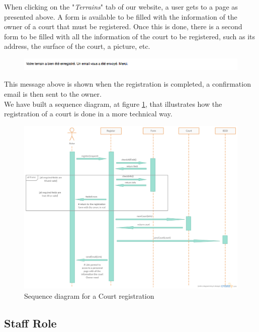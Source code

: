 \documentclass[a4paper, 12pt]{article}
\begin{document}
When clicking on the "\textit{Terrains}" tab of our website, a user gets to a page as presented above. A form is available to be filled with the information of the owner of a court that must be registered. Once this is done, there is a second form to be filled with all the information of the court to be registered, such as its address, the surface of the court, a picture, etc.\\

\begin{figure}[h]
\includegraphics[scale=0.5]{courtmail.png}
\end{figure}

This message above is shown when the registration is completed, a confirmation email is then sent to the owner.\\

We have built a sequence diagram, at figure \ref{courtseq}, that illustrates how the registration of a court is done in a more technical way.\\

\begin{figure}[h]
   \caption{\label{courtseq} Sequence diagram for a Court registration}
  \includegraphics[scale=0.4]{courtseq.png}
\end{figure}

\FloatBarrier
\newpage

\subsection*{Staff Role}
\end{document}
